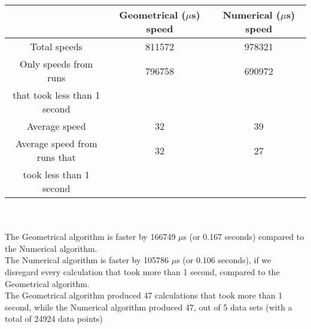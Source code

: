 \begin{tabular}[3]{c|c|c}
 & Geometrical ($\mu$s) speed & Numerical ($\mu$s) speed\\
\hline
Total speeds & 811572 & 978321 \\ 
\hline 
Only speeds from runs & 796758 & 690972 \\ 
that took less than 1 second & & \\ 
\hline
Average speed & 32 & 39 \\
\hline
Average speed from runs that & 32 & 27 \\ 
took less than 1 second & & \\ 
\end{tabular}\\ \\
The Geometrical algorithm is faster by 166749 $\mu$s (or 0.167 seconds) compared to the Numerical algorithm.\\
The Numerical algorithm is faster by 105786 $\mu$s (or 0.106 seconds), if we disregard every calculation that took more than 1 second, compared to the Geometrical algorithm.\\
The Geometrical algorithm produced 47 calculations that took more than 1 second, while the Numerical algorithm produced 47, out of 5 data sets (with a total of 24924 data points)\\
